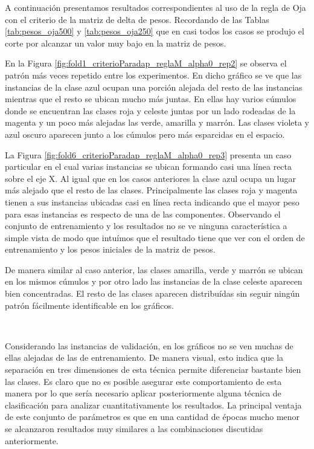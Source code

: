 \documentclass[informe.tex]{subfiles}
\begin{document}
      
      
      
      
      
      
      
      
	A continuación presentamos resultados correspondientes al uso de la regla de Oja con el criterio de la matriz de delta de pesos. Recordando de las Tablas \ref{tab:pesos_oja500} y \ref{tab:pesos_oja250} que en casi todos los casos se produjo el corte por alcanzar un valor muy bajo en la matriz de pesos.
	
	En la Figura \ref{fig:fold1_criterioParadap_reglaM_alpha0_rep2} se observa el patrón más veces repetido entre los experimentos. En dicho gráfico se ve que las instancias de la clase azul ocupan una porción alejada del resto de las instancias mientras que el resto se ubican mucho más juntas. En ellas hay varios cúmulos donde se encuentran las clases roja y celeste juntas por un lado rodeadas de la magenta y un poco más alejadas las verde, amarilla y marrón. Las clases violeta y azul oscuro aparecen junto a los cúmulos pero más esparcidas en el espacio.
	
	La Figura \ref{fig:fold6_criterioParadap_reglaM_alpha0_rep3} presenta un caso particular en el cual varias instancias se ubican formando casi una línea recta sobre el eje X. Al igual que en los casos anteriores la clase azul ocupa un lugar más alejado que el resto de las clases. Principalmente las clases roja y magenta tienen a sus instancias ubicadas casi en línea recta indicando que el mayor peso para esas instancias es respecto de una de las componentes. Observando el conjunto de entrenamiento y los resultados no se ve ninguna característica a simple vista de modo que intuímos que el resultado tiene que ver con el orden de entrenamiento y los pesos iniciales de la matriz de pesos.
	
	De manera similar al caso anterior, las clases amarilla, verde y marrón se ubican en los mismos cúmulos y por otro lado las instancias de la clase celeste aparecen bien concentradas. El resto de las clases aparecen distribuídas sin seguir ningún patrón fácilmente identificable en los gráficos.
	
	~
	
	Considerando las instancias de validación, en los gráficos no se ven muchas de ellas alejadas de las de entrenamiento. De manera visual, esto indica que la separación en tres dimensiones de esta técnica permite diferenciar bastante bien las clases. Es claro que no es posible asegurar este comportamiento de esta manera por lo que sería necesario aplicar posteriormente alguna técnica de clasificación para analizar cuantitativamente los resultados. La principal ventaja de este conjunto de parámetros es que en una cantidad de épocas mucho menor se alcanzaron resultados muy similares a las combinaciones discutidas anteriormente.
      
\end{document}
